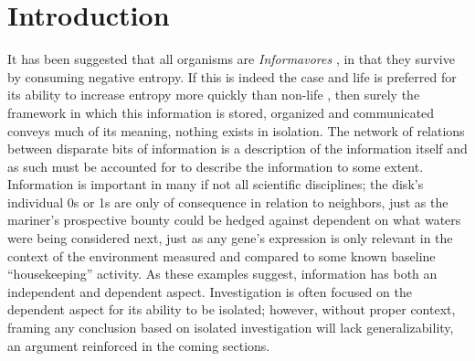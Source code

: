

\graphicspath{{1_introduction/figures/}} %





\setcounter{page}{1}
\chapter{Introduction}
\label{sec:intro}
It has been suggested that all organisms are \emph{Informavores} \citep{MARGALEF1996141}, in that they survive by consuming negative entropy. If this is indeed the case and life is preferred for its ability to increase entropy more quickly than non-life \citep{england2013statistical}, then surely the framework in which this information is stored, organized and communicated conveys much of its meaning, \ie nothing exists in isolation. The network of relations between disparate bits of information is a description of the information itself and as such must be accounted for to describe the information to some extent. Information is important in many if not all scientific disciplines; the disk's individual 0s or 1s are only of consequence in relation to neighbors, just as the mariner's prospective bounty could be hedged against dependent on what waters were being considered next, just as any gene's expression is only relevant in the context of the environment measured and compared to some known baseline \eg ``housekeeping'' activity. As these examples suggest, information has both an independent and dependent aspect. Investigation is often focused on the dependent aspect for its ability to be isolated; however, without proper context, framing any conclusion based on isolated investigation will lack generalizability, an argument reinforced in the coming sections.

